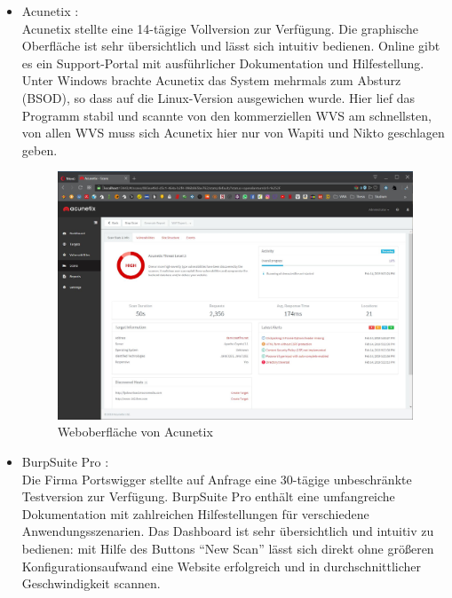 \documentclass[12pt,oneside,a4paper,parskip]{scrbook}
\begin{document}
      \begin{itemize}
        \item Acunetix \cite{Acunetix}:\\
          Acunetix stellte eine 14-tägige Vollversion zur Verfügung. Die graphische Oberfläche ist sehr übersichtlich und lässt sich intuitiv bedienen. Online gibt es ein Support-Portal mit ausführlicher Dokumentation und Hilfestellung.
          Unter Windows brachte Acunetix das System mehrmals zum Absturz (BSOD), so dass auf die Linux-Version ausgewichen wurde. Hier lief das Programm stabil und scannte von den kommerziellen WVS am schnellsten, von allen WVS muss sich Acunetix hier nur von Wapiti und Nikto geschlagen geben.
          \begin{figure}[H]
            \includegraphics[width=1\textwidth]{Images/Acunetix}
            \caption[Weboberfläche von Acunetix]{Weboberfläche von Acunetix}
          \end{figure}
        \item BurpSuite Pro \cite{Burp}:\\
          Die Firma Portswigger stellte auf Anfrage eine 30-tägige unbeschränkte Testversion zur Verfügung.
          BurpSuite Pro enthält eine umfangreiche Dokumentation mit zahlreichen Hilfestellungen für verschiedene Anwendungsszenarien.  Das Dashboard ist sehr übersichtlich und intuitiv zu bedienen: mit Hilfe des Buttons ``New Scan'' lässt sich direkt ohne größeren Konfigurationsaufwand eine Website erfolgreich und in durchschnittlicher Geschwindigkeit scannen.
          \begin{figure}[H]

\end{figure}
\end{itemize}
\end{document}
